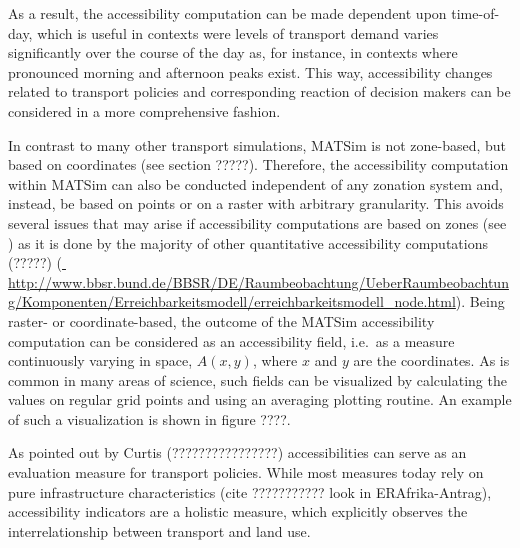 As a result, the accessibility computation can be made dependent upon time-of-day, which is useful in contexts were levels of transport demand varies significantly over the course of the day as, for instance, in contexts where pronounced morning and afternoon peaks exist. This way, accessibility changes related to transport policies and corresponding reaction of decision makers can be considered in a more comprehensive fashion.

In contrast to many other transport simulations, MATSim is not zone-based, but based on coordinates (see section ?????). Therefore, the accessibility computation within MATSim can also be conducted independent of any zonation system and, instead, be based on points or on a raster with arbitrary granularity. This avoids several issues that may arise if accessibility computations are based on zones (see \citep[e.g.][]{NicolaiNagel2012HiResAccessibilityMethodInBook}) as it is done by the majority of other quantitative accessibility computations \citep[e.g.][]{Curtis, BBSR , LiuZhu2004AccessibilityAnalyst} (?????)
(\url{	http://www.bbsr.bund.de/BBSR/DE/Raumbeobachtung/UeberRaumbeobachtung/Komponenten/Erreichbarkeitsmodell/erreichbarkeitsmodell_node.html}). Being raster- or coordinate-based, the outcome of the MATSim accessibility computation can be considered as an accessibility field,
i.e.\ as a measure continuously varying in space, $A(x,y)$, where $x$ and $y$
are the coordinates.  As is common in many areas of science, such
fields can be visualized by calculating the values on regular grid
points and using an averaging plotting routine. An example of such a visualization is shown in figure ????.

As pointed out by Curtis (????????????????) accessibilities can serve as an evaluation measure for transport policies. While most measures today rely on pure infrastructure characteristics (cite ??????????? look in ERAfrika-Antrag), accessibility indicators are a holistic measure, which explicitly observes the interrelationship between transport and land use.


